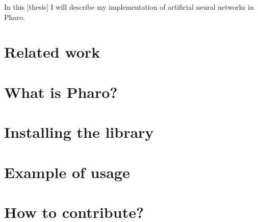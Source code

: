 In this [thesis] I will describe my implementation of artificial neural networks in Pharo. 

\section{Related work}


\section{What is Pharo?}


\section{Installing the library}


\section{Example of usage}


\section{How to contribute?}

